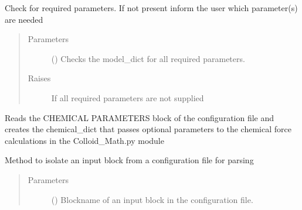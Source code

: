 \documentclass[letterpaper,10pt,english]{sphinxmanual}
\begin{document}
\begin{fulllineitems}
\begin{fulllineitems}
\begin{quote}
\begin{description}
\begin{itemize}
\end{itemize}

\end{description}\end{quote}

\end{fulllineitems}


\begin{fulllineitems}
\label{\detokenize{index:lb_colloids.Colloids.Colloid_IO.Config.check_model_parameters}}
Check for required parameters. If not present inform the user which parameter(s) are needed
\begin{quote}\begin{description}
\item[{Parameters}] \leavevmode
{} () \textendash{} Checks the model\_dict for all required parameters.

\item[{Raises}] \leavevmode
{} \textendash{} If all required parameters are not supplied

\end{description}\end{quote}

\end{fulllineitems}


\begin{fulllineitems}
\label{\detokenize{index:lb_colloids.Colloids.Colloid_IO.Config.chemical_parameters}}
Reads the CHEMICAL PARAMETERS block of the configuration file and creates
the chemical\_dict that passes optional parameters to the chemical force calculations
in the Colloid\_Math.py module

\end{fulllineitems}


\begin{fulllineitems}
\label{\detokenize{index:lb_colloids.Colloids.Colloid_IO.Config.get_block}}
Method to isolate an input block from a configuration file for parsing
\begin{quote}\begin{description}
\item[{Parameters}] \leavevmode
{} () \textendash{} Blockname of an input block in the configuration file.


\end{description}
\end{quote}
\end{fulllineitems}
\end{fulllineitems}
\end{document}
